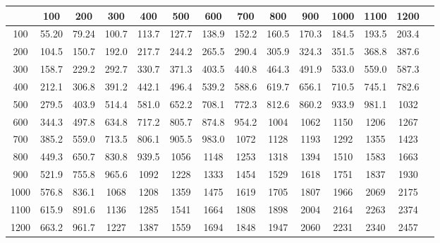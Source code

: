 \begin{center}
\begin{tabular}{|c|c|c|c|c|c|c|c|c|c|c|c|c|c|}
\hline 
 & 100 & 200 & 300 & 400 & 500 & 600 & 700 & 800 & 900 & 1000 & 1100 & 1200\\ 
\hline 
100 & 55.20 & 79.24 & 100.7 & 113.7 & 127.7 & 138.9 & 152.2 & 160.5 & 170.3 & 184.5 & 193.5 & 203.4\\ 
\hline 
200 & 104.5 & 150.7 & 192.0 & 217.7 & 244.2 & 265.5 & 290.4 & 305.9 & 324.3 & 351.5 & 368.8 & 387.6\\ 
\hline 
300 & 158.7 & 229.2 & 292.7 & 330.7 & 371.3 & 403.5 & 440.8 & 464.3 & 491.9 & 533.0 & 559.0 & 587.3\\ 
\hline 
400 & 212.1 & 306.8 & 391.2 & 442.1 & 496.4 & 539.2 & 588.6 & 619.7 & 656.1 & 710.5 & 745.1 & 782.6\\ 
\hline 
500 & 279.5 & 403.9 & 514.4 & 581.0 & 652.2 & 708.1 & 772.3 & 812.6 & 860.2 & 933.9 & 981.1 & 1032\\ 
\hline 
600 & 344.3 & 497.8 & 634.8 & 717.2 & 805.7 & 874.8 & 954.2 & 1004 & 1062 & 1150 & 1206 & 1267\\ 
\hline 
700 & 385.2 & 559.0 & 713.5 & 806.1 & 905.5 & 983.0 & 1072 & 1128 & 1193 & 1292 & 1355 & 1423\\ 
\hline 
800 & 449.3 & 650.7 & 830.8 & 939.5 & 1056 & 1148 & 1253 & 1318 & 1394 & 1510 & 1583 & 1663\\ 
\hline 
900 & 521.9 & 755.8 & 965.6 & 1092 & 1228 & 1333 & 1454 & 1529 & 1618 & 1751 & 1837 & 1930\\ 
\hline 
1000 & 576.8 & 836.1 & 1068 & 1208 & 1359 & 1475 & 1619 & 1705 & 1807 & 1966 & 2069 & 2175\\ 
\hline 
1100 & 615.9 & 891.6 & 1136 & 1285 & 1541 & 1664 & 1808 & 1898 & 2004 & 2164 & 2263 & 2374\\ 
\hline 
1200 & 663.2 & 961.7 & 1227 & 1387 & 1559 & 1694 & 1848 & 1947 & 2060 & 2231 & 2340 & 2457\\ 
\hline 
\end{tabular}
\end{center}